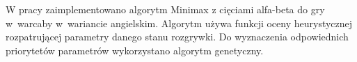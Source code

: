 \begin{streszczenie}
W pracy zaimplementowano algorytm Minimax z cięciami alfa-beta do gry w~warcaby w~wariancie angielskim. Algorytm używa funkcji oceny heurystycznej rozpatrującej parametry danego stanu rozgrywki. Do wyznaczenia odpowiednich priorytetów parametrów wykorzystano algorytm genetyczny. 
\end{streszczenie}
